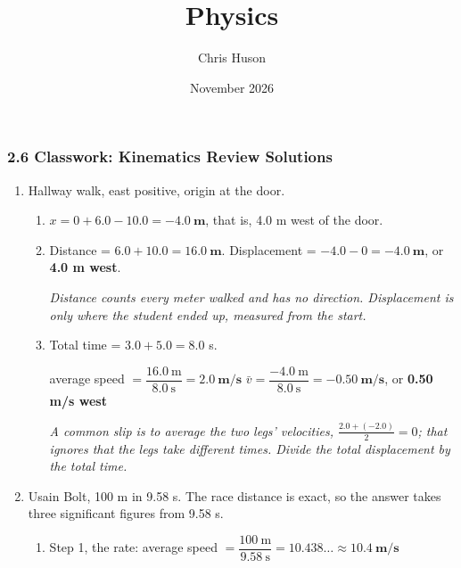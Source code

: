 \documentclass[12pt, twoside]{article}
\title{Physics}
\author{Chris Huson}
\date{November 2026}
\begin{document}
\subsubsection*{2.6 Classwork: Kinematics Review Solutions}

\begin{enumerate}[itemsep=0.5cm]

\item Hallway walk, east positive, origin at the door.

  \begin{center}
  \end{center}

  \begin{enumerate}[itemsep=0.3cm]
    \item $x = 0 + 6.0 - 10.0 = \mathbf{-4.0~\textbf{m}}$, that is, 4.0 m west of the
      door.
    \item Distance = $6.0 + 10.0 = \mathbf{16.0~\textbf{m}}$. \quad Displacement =
      $-4.0 - 0 = \mathbf{-4.0~\textbf{m}}$, or \textbf{4.0 m west}.

      \emph{Distance counts every meter walked and has no direction. Displacement is
      only where the student ended up, measured from the start.}
    \item Total time = $3.0 + 5.0 = 8.0$ s.

      average speed $= \dfrac{16.0~\text{m}}{8.0~\text{s}} = \mathbf{2.0~\textbf{m/s}}$
      \qquad
      $\bar{v} = \dfrac{-4.0~\text{m}}{8.0~\text{s}}
      = \mathbf{-0.50~\textbf{m/s}}$, or \textbf{0.50 m/s west}

      \emph{A common slip is to average the two legs' velocities,
      $\frac{2.0 + (-2.0)}{2} = 0$; that ignores that the legs take different
      times. Divide the total displacement by the total time.}
  \end{enumerate}

\item Usain Bolt, 100 m in 9.58 s. The race distance is exact, so the answer takes
  three significant figures from 9.58 s.
  \begin{enumerate}[itemsep=0.3cm]
    \item Step 1, the rate:
      average speed $= \dfrac{100~\text{m}}{9.58~\text{s}} = 10.438\ldots
      \approx \mathbf{10.4~\textbf{m/s}}$


\end{enumerate}
\end{enumerate}
\end{document}
